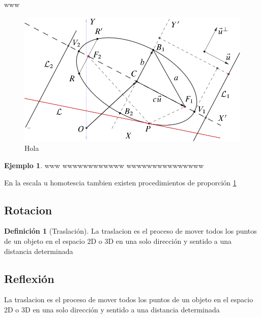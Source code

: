 \documentclass[
  16pt,
]{krantz}
\let\oldincludegraphics\includegraphics
\renewcommand\includegraphics[2][]{%
  \oldincludegraphics[scale=0.85]{#2}
}
\theoremstyle{definition}
\newtheorem{definition}{Definición}[chapter]
\theoremstyle{definition}
\newtheorem{example}{Ejemplo}[chapter]
\theoremstyle{definition}
\theoremstyle{definition}
\theoremstyle{remark}
\begin{document}
www

\begin{figure}

{\centering \includegraphics{elipse} 

}

\caption{Hola}\label{fig:Doge}
\end{figure}

\begin{example}
\protect\hypertarget{exm:unnamed-chunk-3}{}{\label{exm:unnamed-chunk-3} }www wwwwwwwwwwww wwwwwwwwwwwwwww
\end{example}

En la escala u homotescia tambien existen procedimientos de proporción \ref{fig:Doge}

\hypertarget{rotacion}{%
\subsection{Rotacion}\label{rotacion}}

\begin{definition}[Traslación]
\protect\hypertarget{def:rotacion}{}{\label{def:rotacion} {} }La traslacion es el proceso de mover todos los puntos de un objeto en el espacio 2D o 3D en una solo dirección y sentido a una distancia determinada
\end{definition}

\hypertarget{reflexiuxf3n}{%
\subsection{Reflexión}\label{reflexiuxf3n}}

La traslacion es el proceso de mover todos los puntos de un objeto en el espacio 2D o 3D en una solo dirección y sentido a una distancia determinada
\end{document}
